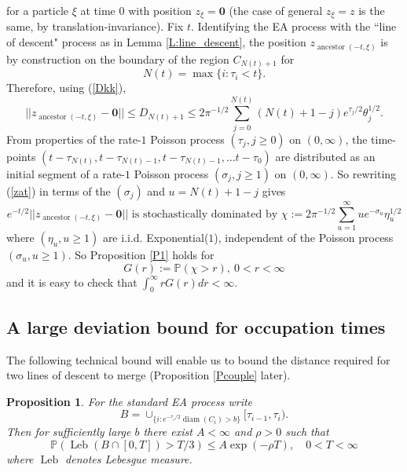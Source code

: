 \documentclass[12pt]{article}
\newtheorem{Proposition}[Lemma]{Proposition}
\newcommand{\origin}{{\mathbf 0}}
\renewcommand{\Pr}{{\mathbb P}}
\DeclareMathOperator{\diam}{diam}
\DeclareMathOperator{\Leb}{Leb}
\DeclareMathOperator{\ancestor}{ancestor}
\begin{document}
for a particle $\xi$ at time $0$ with position $z_\xi = \origin$ 
(the case of general $z_\xi = z$ is the same, by translation-invariance). 
Fix $t$.
 Identifying the EA process with the ``line of descent" process as in Lemma \ref{L:line_descent}, the position 
 $z_{\ancestor(-t,\xi)}$ is by construction on the boundary of the region 
 $C_{N(t) + 1}$ for 
 \[ N(t) = \max \{i: \tau_i < t \} . \] 
 Therefore, using (\ref{Dkk}),
 \begin{equation}
  ||z_{\ancestor(-t,\xi)} - \origin || \le D_{N(t) + 1} \le 2\pi^{-1/2} \sum_{j=0}^{N(t)} 
(N(t)+1-j)  e^{\tau_{j}/2} \theta_{j}^{1/2} . 
\label{zat}
\end{equation}
From properties of the rate-$1$ Poisson process $(\tau_j, j \ge 0)$ on $(0, \infty)$, the time-points
$(t - \tau_{N(t)},   t - \tau_{N(t)-1},  t - \tau_{N(t)-1}, \ldots t -  \tau_0)$ 
are distributed as an initial segment of a rate-$1$ Poisson process $(\sigma_j, j \ge 1)$ on $(0, \infty)$.
So rewriting (\ref{zat}) in terms of the $(\sigma_j)$ and $u = N(t) + 1 - j$ gives 
\begin{equation}
e^{-t/2}   ||z_{\ancestor(-t,\xi)} - \origin || 
\mbox{ is stochastically dominated by } \chi :=   2\pi^{-1/2} \sum_{u=1}^\infty  u e^{- \sigma_u} \eta_u^{1/2} 
\label{etz}
\end{equation}
where  $(\eta_u, u \ge 1)$ are i.i.d. Exponential($1$), independent of  the Poisson process  $(\sigma_u, u \ge 1)$.
So  Proposition \ref{P1} holds for 
\begin{equation}
G(r):= \Pr(\chi > r), \ 0 < r < \infty 
\label{def:Gr}
\end{equation}
and it is easy to check that $\int_0^\infty r G(r) dr < \infty$.









\subsection{A large deviation bound for occupation times}
\label{sec:LD}
The following technical bound will enable us to bound the distance required for two lines of descent to merge (Proposition \ref{Pcouple} later).
 
 
\begin{Proposition}
\label{C:ld}
For the standard EA process write 
\[ B  = \cup_{ \{i:   
e^{-\tau_i/2} \diam(C_{i}) > b 
\}} 
[\tau_{i-1}, \tau_{i}) . \]
Then for sufficiently large $b $ there exist $A < \infty$ and $\rho > 0 $ such that
\begin{equation}
\Pr ( \Leb (B \cap [0,T] ) > T/3) \le A \exp(-\rho T), \quad 0<T<\infty 
\label{ld1}
\end{equation}
where $\Leb$ denotes Lebesgue measure.
\end{Proposition}
\end{document}
